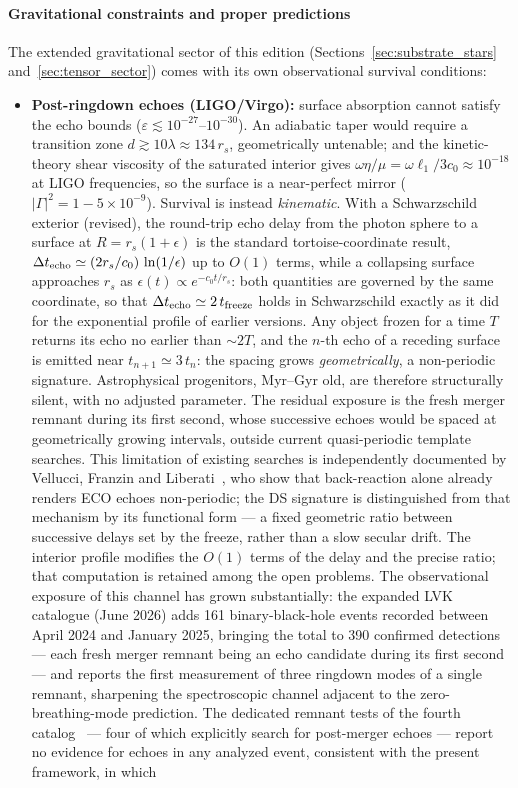 \documentclass[11pt,a4paper]{article}
\theoremstyle{plain}
\theoremstyle{remark}
\begin{document}
\paragraph{Gravitational constraints and proper predictions}
The extended gravitational sector of this edition (Sections~\ref{sec:substrate_stars} and~\ref{sec:tensor_sector}) comes with its own observational survival conditions:
\begin{itemize}
    \item \textbf{Post-ringdown echoes (LIGO/Virgo):} surface absorption cannot satisfy the echo bounds ($\varepsilon \lesssim 10^{-27}$--$10^{-30}$). An adiabatic taper would require a transition zone $d \gtrsim 10\lambda \approx 134\,r_s$, geometrically untenable; and the kinetic-theory shear viscosity of the saturated interior gives $\omega\eta/\mu = \omega\ell_1/3c_0 \approx 10^{-18}$ at LIGO frequencies, so the surface is a near-perfect mirror ($|\Gamma|^2 = 1 - 5\times10^{-9}$). Survival is instead \emph{kinematic}. With a Schwarzschild exterior (revised), the round-trip echo delay from the photon sphere to a surface at $R = r_s(1+\epsilon)$ is the standard tortoise-coordinate result, $\Delta t_{\rm echo} \simeq (2r_s/c_0)\,\ln(1/\epsilon)$ up to $O(1)$ terms, while a collapsing surface approaches $r_s$ as $\epsilon(t) \propto e^{-c_0 t/r_s}$: both quantities are governed by the same coordinate, so that $\Delta t_{\rm echo} \simeq 2\,t_{\rm freeze}$ holds in Schwarzschild exactly as it did for the exponential profile of earlier versions. Any object frozen for a time $T$ returns its echo no earlier than $\sim 2T$, and the $n$-th echo of a receding surface is emitted near $t_{n+1} \simeq 3\,t_n$: the spacing grows \emph{geometrically}, a non-periodic signature. Astrophysical progenitors, Myr--Gyr old, are therefore structurally silent, with no adjusted parameter. The residual exposure is the fresh merger remnant during its first second, whose successive echoes would be spaced at geometrically growing intervals, outside current quasi-periodic template searches. This limitation of existing searches is independently documented by Vellucci, Franzin and Liberati~\cite{vellucci2022}, who show that back-reaction alone already renders ECO echoes non-periodic; the DS signature is distinguished from that mechanism by its functional form --- a fixed geometric ratio between successive delays set by the freeze, rather than a slow secular drift. The interior profile modifies the $O(1)$ terms of the delay and the precise ratio; that computation is retained among the open problems. The observational exposure of this channel has grown substantially: the expanded LVK catalogue (June 2026) adds 161 binary-black-hole events recorded between April 2024 and January 2025, bringing the total to 390 confirmed detections --- each fresh merger remnant being an echo candidate during its first second --- and reports the first measurement of three ringdown modes of a single remnant, sharpening the spectroscopic channel adjacent to the zero-breathing-mode prediction. The dedicated remnant tests of the fourth catalog~\cite{lvk_tgr4_iii} --- four of which explicitly search for post-merger echoes --- report no evidence for echoes in any analyzed event, consistent with the present framework, in which 
\end{itemize}
\end{document}
